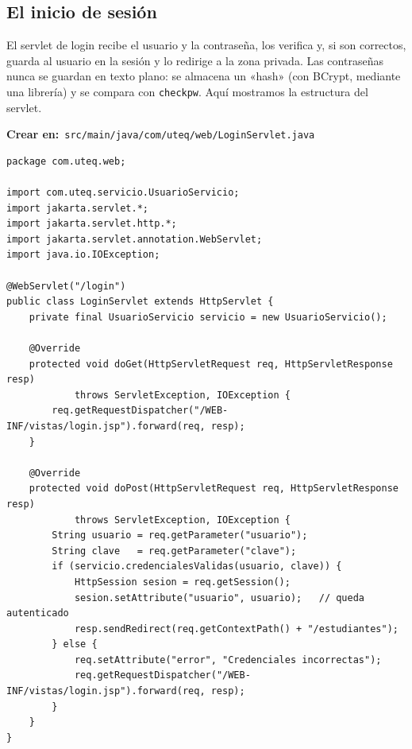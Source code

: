\documentclass[11pt]{article}
\begin{document}
\subsection{El inicio de sesión}
El servlet de login recibe el usuario y la contraseña, los verifica y, si son correctos, guarda al usuario en la sesión y lo redirige a la zona privada. Las contraseñas nunca se guardan en texto plano: se almacena un «hash» (con BCrypt, mediante una librería) y se compara con \texttt{checkpw}. Aquí mostramos la estructura del servlet.

{\small\color{jwebazulo}\textbf{Crear en:}~}\texttt{src/\allowbreak{}main/\allowbreak{}java/\allowbreak{}com/\allowbreak{}uteq/\allowbreak{}web/\allowbreak{}Login\allowbreak{}Servlet.\allowbreak{}java}\par\nobreak\vspace{-1pt}
\begin{cajacodigo}
\begin{lstlisting}[style=java]
package com.uteq.web;

import com.uteq.servicio.UsuarioServicio;
import jakarta.servlet.*;
import jakarta.servlet.http.*;
import jakarta.servlet.annotation.WebServlet;
import java.io.IOException;

@WebServlet("/login")
public class LoginServlet extends HttpServlet {
    private final UsuarioServicio servicio = new UsuarioServicio();

    @Override
    protected void doGet(HttpServletRequest req, HttpServletResponse resp)
            throws ServletException, IOException {
        req.getRequestDispatcher("/WEB-INF/vistas/login.jsp").forward(req, resp);
    }

    @Override
    protected void doPost(HttpServletRequest req, HttpServletResponse resp)
            throws ServletException, IOException {
        String usuario = req.getParameter("usuario");
        String clave   = req.getParameter("clave");
        if (servicio.credencialesValidas(usuario, clave)) {
            HttpSession sesion = req.getSession();
            sesion.setAttribute("usuario", usuario);   // queda autenticado
            resp.sendRedirect(req.getContextPath() + "/estudiantes");
        } else {
            req.setAttribute("error", "Credenciales incorrectas");
            req.getRequestDispatcher("/WEB-INF/vistas/login.jsp").forward(req, resp);
        }
    }
}
\end{lstlisting}
\end{cajacodigo}
\vspace{2pt}
\end{document}
